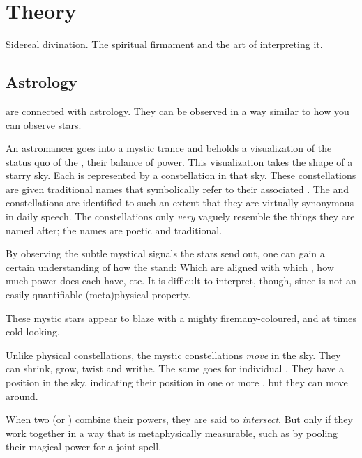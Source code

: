 \section{\Matrix Theory}
Sidereal divination. 
The spiritual firmament and the art of interpreting it. 







\subsection{Astrology}
\Matrices{} are connected with {astrology}. 
They can be observed in a way similar to how you can observe stars. 

An astromancer goes into a mystic trance and beholds a visualization of the status quo of the \nexuses, their balance of power. 
This visualization takes the shape of a starry sky. 
Each \nexus{} is represented by a constellation in that sky. 
These constellations are given traditional names that symbolically refer to their associated \nexus. 
The \nexuses{} and constellations are identified to such an extent that they are virtually synonymous in daily speech. 
The constellations only \emph{very} vaguely resemble the things they are named after; the names are poetic and traditional. 

By observing the subtle mystical signals the stars send out, one can gain a certain understanding of how the \nexuses{} stand: 
Which \vertices{} are aligned with which \nexuses, how much power does each \nexus{} have, etc. 
It is difficult to interpret, though, since  is not an easily quantifiable (meta)physical property. 

These mystic stars appear to blaze with a mighty fire\dash many-coloured, and at times cold-looking.

Unlike physical constellations, the mystic constellations \emph{move} in the sky. 
They can shrink, grow, twist and writhe. 
The same goes for individual \vertices.
They have a position in the sky, indicating their position in one or more \nexuses, but they can move around.  

When two \nexuses{} (or \vertices) combine their powers, they are said to \emph{intersect}.
But only if they work together in a way that is metaphysically measurable, such as by pooling their magical power for a joint spell. 





